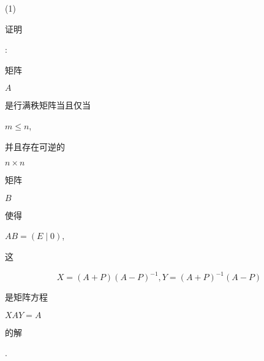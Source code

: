 \documentclass[10pt]{article}
\begin{document}
(1) \begin{CJK}{UTF8}{mj}证明\end{CJK}: \begin{CJK}{UTF8}{mj}矩阵\end{CJK} $A$ \begin{CJK}{UTF8}{mj}是行满秩矩阵当且仅当\end{CJK} $m \leqslant n$, \begin{CJK}{UTF8}{mj}并且存在可逆的\end{CJK} $n \times n$ \begin{CJK}{UTF8}{mj}矩阵\end{CJK} $B$ \begin{CJK}{UTF8}{mj}使得\end{CJK} $A B=(E \mid 0)$, \begin{CJK}{UTF8}{mj}这\end{CJK}
$$
X=(A+P)(A-P)^{-1}, Y=(A+P)^{-1}(A-P)
$$
\begin{CJK}{UTF8}{mj}是矩阵方程\end{CJK} $X A Y=A$ \begin{CJK}{UTF8}{mj}的解\end{CJK}.
\end{document}
